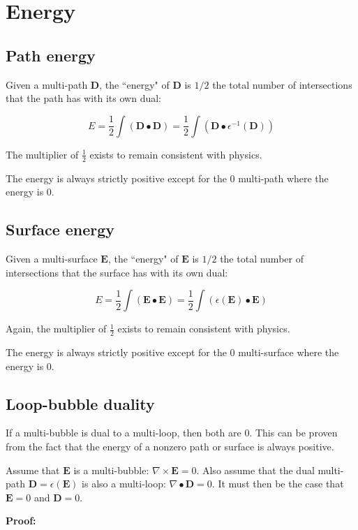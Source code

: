 \section{Energy}

\subsection{Path energy}

Given a multi-path \(\mathbf{D}\), the ``energy" of \(\mathbf{D}\) is \(1/2\) the total number of intersections that the path has with its own dual:

\[E = \frac{1}{2}\int (\mathbf{D} \bullet \mathbf{D}) = \frac{1}{2}\int (\mathbf{D} \bullet \epsilon^{-1}(\mathbf{D}))\]

The multiplier of \(\frac{1}{2}\) exists to remain consistent with physics.

The energy is always strictly positive except for the \(0\) multi-path where the energy is \(0\).


\subsection{Surface energy}

Given a multi-surface \(\mathbf{E}\), the ``energy" of \(\mathbf{E}\) is \(1/2\) the total number of intersections that the surface has with its own dual:

\[E = \frac{1}{2}\int (\mathbf{E} \bullet \mathbf{E}) = \frac{1}{2}\int (\epsilon(\mathbf{E}) \bullet \mathbf{E})\]

Again, the multiplier of \(\frac{1}{2}\) exists to remain consistent with physics.

The energy is always strictly positive except for the \(0\) multi-surface where the energy is \(0\).


\subsection{Loop-bubble duality}


If a multi-bubble is dual to a multi-loop, then both are \(0\). This can be proven from  the fact that the energy of a nonzero path or surface is always positive. 

\begin{thm}\label{thm:loop_bubble_duality}
Assume that \(\mathbf{E}\) is a multi-bubble: \(\nabla \times \mathbf{E} = 0\). Also assume that the dual multi-path \(\mathbf{D} = \epsilon(\mathbf{E})\) is also a multi-loop: \(\nabla \bullet \mathbf{D} = 0\). It must then be the case that \(\mathbf{E} = 0\) and \(\mathbf{D} = 0\).
\end{thm}
\textbf{Proof:}

